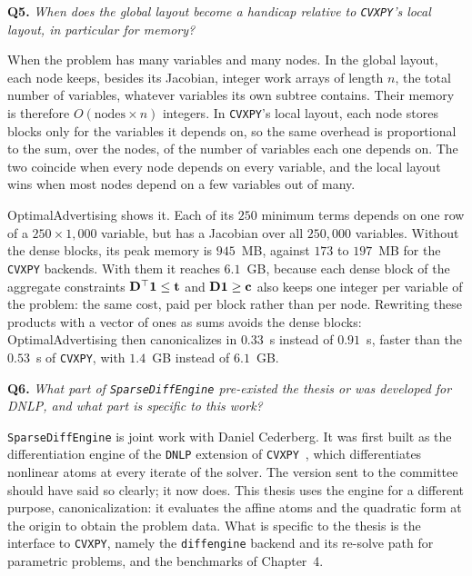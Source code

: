 \documentclass[letterpaper,12pt]{article}
\newcommand{\question}[2]{\FloatBarrier\par\bigskip\textbf{Q#1.} \emph{#2}\par}
\begin{document}
\question{5}{When does the global layout become a handicap relative to \texttt{CVXPY}'s local
layout, in particular for memory?}
When the problem has many variables and many nodes. In the global layout, each node keeps,
besides its Jacobian, integer work arrays of length $n$, the total number of variables, whatever
variables its own subtree contains. Their memory is therefore $O(\text{nodes} \times n)$
integers. In \texttt{CVXPY}'s local layout, each node stores blocks only for the variables it
depends on, so the same overhead is proportional to the sum, over the nodes, of the number of
variables each one depends on. The two coincide when every node depends on every variable, and
the local layout wins when most nodes depend on a few variables out of many.

OptimalAdvertising shows it. Each of its $250$ minimum terms depends on one row of a
$250 \times 1{,}000$ variable, but has a Jacobian over all $250{,}000$ variables. Without the dense
blocks, its peak memory is $945$~MB, against $173$ to $197$~MB for the \texttt{CVXPY} backends.
With them it reaches $6.1$~GB, because each dense block of the aggregate constraints
$\mathbf{D}^\top \mathbf 1 \le \mathbf{t}$ and $\mathbf{D} \mathbf 1 \ge \mathbf{c}$ also keeps one integer per
variable of the problem: the same cost, paid per block rather than per node. Rewriting these
products with a vector of ones as sums avoids the dense blocks: OptimalAdvertising then
canonicalizes in $0.33$~s instead of $0.91$~s, faster than the $0.53$~s of \texttt{CVXPY}, with
$1.4$~GB instead of $6.1$~GB.


\question{6}{What part of \texttt{SparseDiffEngine} pre-existed the thesis or was developed for
DNLP, and what part is specific to this work?}
\texttt{SparseDiffEngine} is joint work with Daniel Cederberg. It was first built as the
differentiation engine of the \texttt{DNLP} extension of
\texttt{CVXPY}~\cite{cederberg2025disciplined}, which differentiates nonlinear atoms at every
iterate of the solver.
The version sent to the committee should have said so clearly; it
now does. This thesis uses the engine for a different
purpose, canonicalization: it evaluates the affine atoms and the quadratic form at the origin to
obtain the problem data. What is specific to the thesis is the interface to \texttt{CVXPY},
namely the \texttt{diffengine} backend and its re-solve path for parametric problems, and the
benchmarks of Chapter~4.
\end{document}
